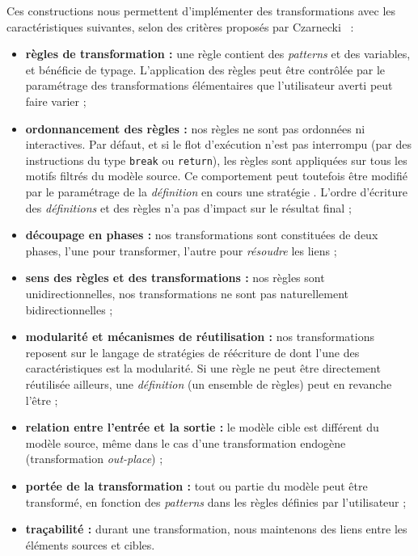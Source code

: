 Ces constructions nous permettent d'implémenter des transformations avec les
caractéristiques suivantes, selon des critères proposés par
Czarnecki~\cite{Czarnecki2003,ibm06} :
\begin{itemize}

  \item \textbf{règles de transformation :} une règle contient des
    \emph{patterns} et des variables, et bénéficie de typage. L'application
    des règles peut être contrôlée par le paramétrage des transformations
    élémentaires que l'utilisateur averti peut faire varier ;

  \item \textbf{ordonnancement des règles :} nos règles ne sont pas ordonnées
    ni interactives. Par défaut, et si le flot d'exécution n'est pas interrompu
    (par des instructions du type \texttt{break} ou \texttt{return}), les règles
    sont appliquées sur tous les motifs filtrés du modèle source. Ce
    comportement peut toutefois être modifié par le paramétrage de la
    \emph{définition} en cours {\via} une stratégie {\adhoc}. L'ordre
    d'écriture des \emph{définitions} et des règles n'a pas d'impact sur le
    résultat final ;

  \item \textbf{découpage en phases :} nos transformations sont constituées de
    deux phases, l'une pour transformer, l'autre pour \emph{résoudre} les
    liens ;

  \item \textbf{sens des règles et des transformations :} nos règles sont
    unidirectionnelles, nos transformations ne sont pas naturellement
    bidirectionnelles ;

  \item \textbf{modularité et mécanismes de réutilisation :} nos
    transformations reposent sur le langage de stratégies de réécriture de
    {\tom} dont l'une des caractéristiques est la modularité. Si une règle ne
    peut être directement réutilisée ailleurs, une \emph{définition} (un
    ensemble de règles) peut en revanche l'être ;

  \item \textbf{relation entre l'entrée et la sortie :} le modèle cible est
    différent du modèle source, même dans le cas d'une transformation endogène
    (transformation \emph{out-place}) ;
  
  \item \textbf{portée de la transformation :} tout ou partie du modèle peut
    être transformé, en fonction des \emph{patterns} dans les règles définies
    par l'utilisateur ;

  \item \textbf{traçabilité :} durant une transformation, nous maintenons des
    liens entre les éléments sources et cibles.

\end{itemize}%

